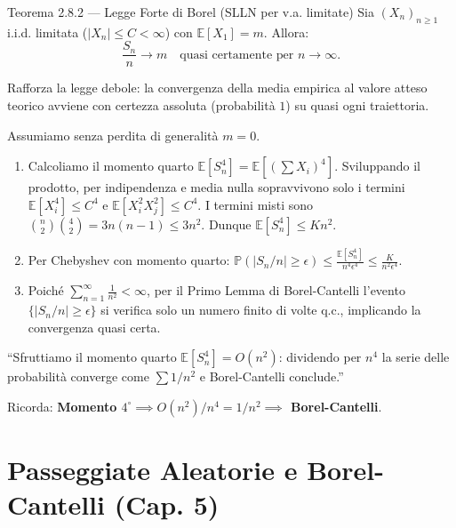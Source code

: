 \documentclass[11pt,a4paper]{report}
\begin{document}
\begin{teoremabox}{Teorema 2.8.2 --- Legge Forte di Borel (SLLN per v.a. limitate)}
Sia $(X_n)_{n \ge 1}$ i.i.d. limitata ($|X_n| \le C < \infty$) con $\mathbb{E}[X_1] = m$. Allora:
\[
\frac{S_n}{n} \longrightarrow m \quad \text{quasi certamente per } n \to \infty.
\]

\begin{cosafa}
Rafforza la legge debole: la convergenza della media empirica al valore atteso teorico avviene con certezza assoluta (probabilità $1$) su quasi ogni traiettoria.
\end{cosafa}

\begin{dimostrazione}
Assumiamo senza perdita di generalità $m=0$.
\begin{enumerate}
    \item Calcoliamo il momento quarto $\mathbb{E}[S_n^4] = \mathbb{E}\left[\left(\sum X_i\right)^4\right]$. Sviluppando il prodotto, per indipendenza e media nulla sopravvivono solo i termini $\mathbb{E}[X_i^4] \le C^4$ e $\mathbb{E}[X_i^2 X_j^2] \le C^4$. I termini misti sono $\binom{n}{2}\binom{4}{2} = 3n(n-1) \le 3n^2$. Dunque $\mathbb{E}[S_n^4] \le K n^2$.
    \item Per Chebyshev con momento quarto: $\mathbb{P}(|S_n/n| \ge \epsilon) \le \frac{\mathbb{E}[S_n^4]}{n^4 \epsilon^4} \le \frac{K}{n^2 \epsilon^4}$.
    \item Poiché $\sum_{n=1}^\infty \frac{1}{n^2} < \infty$, per il Primo Lemma di Borel-Cantelli l'evento $\{|S_n/n| \ge \epsilon\}$ si verifica solo un numero finito di volte q.c., implicando la convergenza quasi certa.
\end{enumerate}
\end{dimostrazione}

\begin{oralbox}
``Sfruttiamo il momento quarto $\mathbb{E}[S_n^4] = O(n^2)$: dividendo per $n^4$ la serie delle probabilità converge come $\sum 1/n^2$ e Borel-Cantelli conclude.''
\end{oralbox}

\begin{tipbox}
Ricorda: \textbf{Momento $4^\circ \implies O(n^2)/n^4 = 1/n^2 \implies$ Borel-Cantelli}.
\end{tipbox}
\end{teoremabox}

\newpage

\chapter{Passeggiate Aleatorie e Borel-Cantelli (Cap. 5)}
\end{document}
